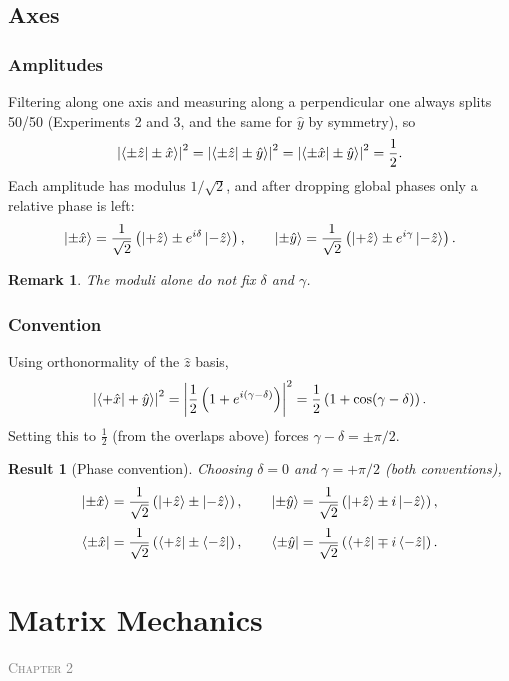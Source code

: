\documentclass{article}
\newtheorem{remark}{Remark}
\newtheorem{result}{Result}
\newcommand{\chapterstart}[1]{\noindent\hfill{\small\scshape\textcolor{gray}{Chapter #1}}\par}
\begin{document}
\subsection{Axes}
\label{sec:xy-states}
\subsubsection{Amplitudes}
Filtering along one axis and measuring along a perpendicular one always splits 50/50 (Experiments 2 and 3, and the same for $\hat{y}$ by symmetry), so
\[\left|\braket{\pm\hat{z}|\pm\hat{x}}\right|^2 = \left|\braket{\pm\hat{z}|\pm\hat{y}}\right|^2 = \left|\braket{\pm\hat{x}|\pm\hat{y}}\right|^2 = \frac{1}{2}.\]
Each amplitude has modulus $1/\sqrt{2}$, and after dropping global phases only a relative phase is left:
\[\ket{\pm\hat{x}} = \frac{1}{\sqrt{2}}\left(\ket{+\hat{z}} \pm e^{i\delta}\ket{-\hat{z}}\right), \qquad \ket{\pm\hat{y}} = \frac{1}{\sqrt{2}}\left(\ket{+\hat{z}} \pm e^{i\gamma}\ket{-\hat{z}}\right).\]
\begin{remark}
    The moduli alone do not fix $\delta$ and $\gamma$.
\end{remark}

\subsubsection{Convention}
Using orthonormality of the $\hat{z}$ basis,
\[\left|\braket{+\hat{x}|+\hat{y}}\right|^2 = \left|\frac{1}{2}\left(1 + e^{i(\gamma - \delta)}\right)\right|^2 = \frac{1}{2}\left(1 + \cos(\gamma - \delta)\right).\]
Setting this to $\tfrac12$ (from the overlaps above) forces $\gamma - \delta = \pm\pi/2$.
\begin{result}[Phase convention]
    Choosing $\delta = 0$ and $\gamma = +\pi/2$ (both conventions),
    \begin{equation}
        \ket{\pm\hat{x}} = \frac{1}{\sqrt{2}}\left(\ket{+\hat{z}} \pm \ket{-\hat{z}}\right), \qquad
        \ket{\pm\hat{y}} = \frac{1}{\sqrt{2}}\left(\ket{+\hat{z}} \pm i\ket{-\hat{z}}\right),
    \end{equation}
    \begin{equation}
        \bra{\pm\hat{x}} = \frac{1}{\sqrt{2}}\left(\bra{+\hat{z}} \pm \bra{-\hat{z}}\right), \qquad \bra{\pm\hat{y}} = \frac{1}{\sqrt{2}}\left(\bra{+\hat{z}} \mp i\bra{-\hat{z}}\right).
    \end{equation}
\end{result}


\section{Matrix Mechanics}
\chapterstart{2}
\end{document}
